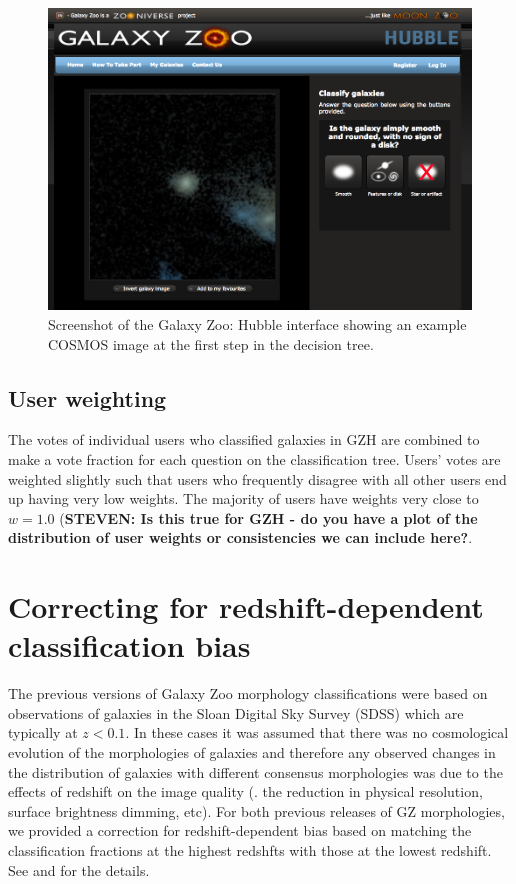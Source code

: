 \documentclass[usenatbib]{mn2e}
\begin{document}
\begin{figure}
\includegraphics[width=160mm]{figures/gzh_interface.png}
\caption{Screenshot of the Galaxy Zoo: Hubble interface showing an example COSMOS image at the first step in the decision tree.\label{fig:interface}}
\end{figure}

\subsection{User weighting}\label{ssec:weighting}
The votes of individual users who classified galaxies in GZH are combined to make a vote fraction for each question on the classification tree. Users' votes are weighted slightly \citep[in a method identical to that described in][]{wil13} such that users who frequently disagree with all other users end up having very low weights. The majority of users have weights very close to $w=1.0$ ({\bf STEVEN: Is this true for GZH - do you have a plot of the distribution of user weights or consistencies we can include here?}. 


\section{Correcting for redshift-dependent classification bias}\label{sec:debiasing}

The previous versions of Galaxy Zoo morphology classifications \citep{lin08,wil13} were based on observations of galaxies in the Sloan Digital Sky Survey (SDSS) which are typically at $z<0.1$. In these cases it was assumed that there was no cosmological evolution of the morphologies of galaxies and therefore any observed changes in the distribution of galaxies with different consensus morphologies was due to the effects of redshift on the image quality (\ie. the reduction in physical resolution, surface brightness dimming, etc). For both previous releases of GZ morphologies, we provided a correction for redshift-dependent bias based on matching the classification fractions at the highest redshfts with those at the lowest redshift. See \citet{bam09} and \citet{wil13} for the details. 
\end{document}

